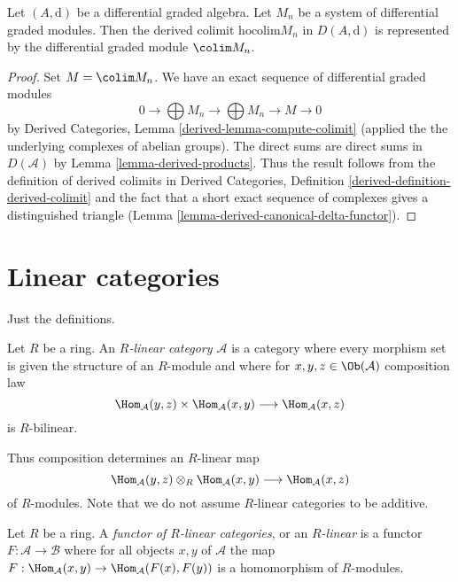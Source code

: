 \begin{lemma}
\label{lemma-homotopy-colimit}
Let $(A, \text{d})$ be a differential graded algebra. Let
$M_n$ be a system of differential graded modules. Then the derived
colimit $\text{hocolim} M_n$ in $D(A, \text{d})$ is represented
by the differential graded module $\colim M_n$.
\end{lemma}

\begin{proof}
Set $M = \colim M_n$. We have an exact sequence of differential graded modules
$$
0 \to \bigoplus M_n \to \bigoplus M_n \to M \to 0
$$
by Derived Categories, Lemma \ref{derived-lemma-compute-colimit}
(applied the the underlying complexes of abelian groups).
The direct sums are direct sums in $D(\mathcal{A})$ by
Lemma \ref{lemma-derived-products}.
Thus the result follows from the definition
of derived colimits in Derived Categories,
Definition \ref{derived-definition-derived-colimit}
and the fact that a short exact sequence of complexes
gives a distinguished triangle
(Lemma \ref{lemma-derived-canonical-delta-functor}).
\end{proof}








\section{Linear categories}
\label{section-linear}

\noindent
Just the definitions.

\begin{definition}
\label{definition-linear-category}
Let $R$ be a ring. An {\it $R$-linear category $\mathcal{A}$} is a category
where every morphism set is given the structure of an $R$-module
and where for $x, y, z \in \Ob(\mathcal{A})$ composition law
$$
\Hom_\mathcal{A}(y, z) \times \Hom_\mathcal{A}(x, y)
\longrightarrow
\Hom_\mathcal{A}(x, z)
$$
is $R$-bilinear.
\end{definition}

\noindent
Thus composition determines an $R$-linear map
$$
\Hom_\mathcal{A}(y, z) \otimes_R \Hom_\mathcal{A}(x, y)
\longrightarrow
\Hom_\mathcal{A}(x, z)
$$
of $R$-modules. Note that we do not assume $R$-linear categories to be
additive.

\begin{definition}
\label{definition-functor-linear-categories}
Let $R$ be a ring. A {\it functor of $R$-linear categories}, or an
{\it $R$-linear} is a functor $F : \mathcal{A} \to \mathcal{B}$
where for all objects $x, y$ of $\mathcal{A}$ the map
$F : \Hom_\mathcal{A}(x, y) \to \Hom_\mathcal{A}(F(x), F(y))$
is a homomorphism of $R$-modules.
\end{definition}







